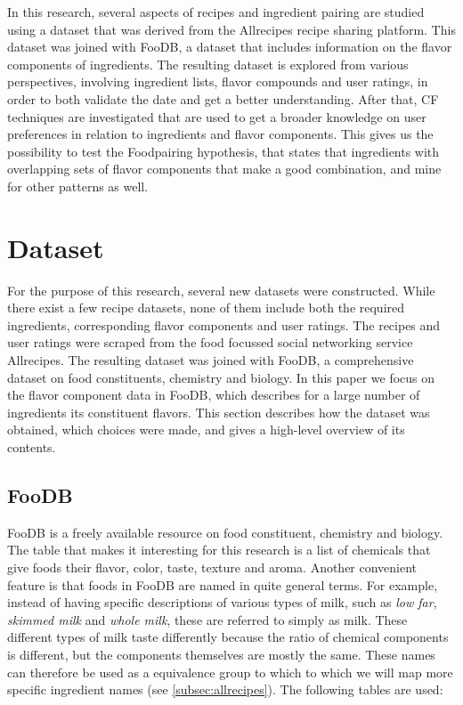 In this research, several aspects of recipes and ingredient pairing are studied using a dataset that was derived from the Allrecipes recipe sharing platform.
This dataset was joined with FooDB, a dataset that includes information on the flavor components of ingredients.
The resulting dataset is explored from various perspectives, involving ingredient lists, flavor compounds and user ratings, in order to both validate the date and get a better understanding.
After that, CF techniques are investigated that are used to get a broader knowledge on user preferences in relation to ingredients and flavor components. 
This gives us the possibility to test the Foodpairing hypothesis, that states that ingredients with overlapping sets of flavor components that make a good combination, and mine for other patterns as well.




\section{Dataset}
\label{sec:dataset}

For the purpose of this research, several new datasets were constructed.
While there exist a few recipe datasets, none of them include both the required ingredients, corresponding flavor components and user ratings.
The recipes and user ratings were scraped from the food focussed social networking service Allrecipes.
The resulting dataset was joined with FooDB, a comprehensive dataset on food constituents, chemistry and biology.
In this paper we focus on the flavor component data in FooDB, which  describes for a large number of ingredients its constituent flavors.
This section describes how the dataset was obtained, which choices were made, and gives a high-level overview of its contents.


\subsection{FooDB}
\label{subsec:foodb}

FooDB is a freely available resource on food constituent, chemistry and biology.
The table that makes it interesting for this research is a list of chemicals that give foods their flavor, color, taste, texture and aroma.
Another convenient feature is that foods in FooDB are named in quite general terms.
For example, instead of having specific descriptions of various types of milk, such as \emph{low far}, \emph{skimmed milk} and \emph{whole milk}, these are referred to simply as milk.
These different types of milk taste differently because the ratio of chemical components is different, but the components themselves are mostly the same.
These names can therefore be used as a equivalence group to which to which we will map more specific ingredient names (see \cref{subsec:allrecipes}).
The following tables are used:

